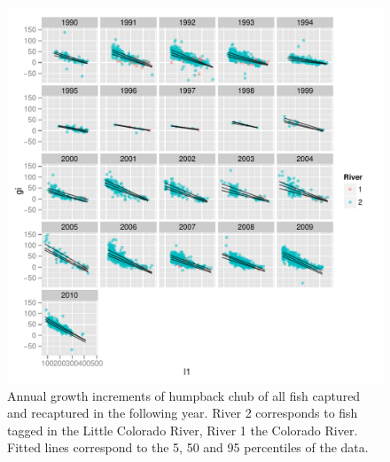 \begin{figure}[htbp]
	\centering
		\includegraphics[width=6.5in]{../FIGS/LSMR/fig:AnnualGrowthIncrements.pdf}
	\caption{Annual growth increments of humpback chub of all fish captured and recaptured in the following year. River 2 corresponds to fish tagged in the Little Colorado River, River 1 the Colorado River. Fitted lines correspond to the 5, 50 and 95 percentiles of the data.}
	\label{fig:FIGS_LSMR_fig:AnnualGrowthIncrements}
\end{figure}

